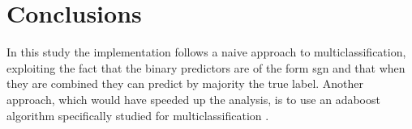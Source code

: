 \documentclass{scrartcl}
\begin{document}
\section{Conclusions}

In this study the implementation follows a naive approach to multiclassification, exploiting the fact that the binary predictors are of the form sgn and that when they are combined they can predict by majority the true label.
Another approach, which would have speeded up the analysis, is to use an adaboost algorithm specifically studied for multiclassification \cite{multi-adaboost}.

\newpage
\end{document}
